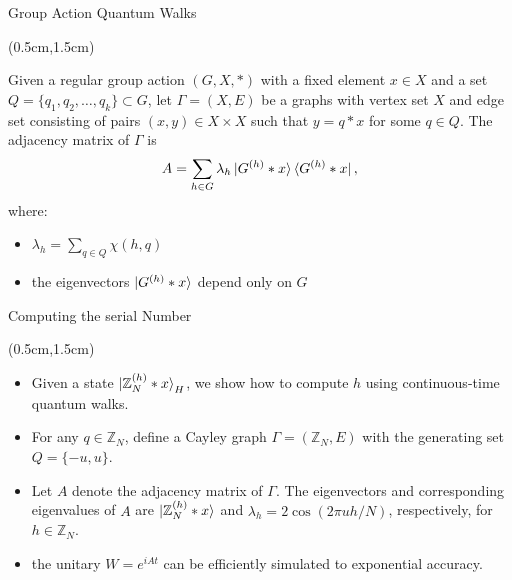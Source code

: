 \documentclass{beamer}
\theoremstyle{definition}
\begin{document}
\begin{frame}{Group Action Quantum Walks}
    
    \begin{textblock*}{12cm}(0.5cm,1.5cm)
               
        Given a regular group action $(G, X, *)$ with a fixed element $x \in X$ and a set  $Q = \{q_1, q_2, \dots, q_k\} \subset G$, let $\Gamma = (X, E)$ be a graphs with vertex set $X$ and edge set consisting of pairs $(x, y) \in X \times X$ such that $y = q * x$ for some $q \in Q$. The adjacency matrix of $\Gamma$ is
        \[ A = \sum_{h \in G} \lambda_h \ket{G^{(h)} * x} \bra{G^{(h)} * x}, \]
        where:
        \begin{itemize}
            \item $\lambda_h = \sum_{q \in Q} \chi(h, q)$
            \item the eigenvectors $\ket{G^{(h)} * x}$ depend only on $G$
        \end{itemize}

    \end{textblock*}

\end{frame}





\begin{frame}{Computing the serial Number}

    \begin{textblock*}{12cm}(0.5cm,1.5cm)

        \begin{itemize}
            \item Given a state $\ket{\mathbb{Z}_N^{(h)} * x}_H$, we show how to compute $h$ using continuous-time quantum walks.
            \vspace{0.5cm}
            \item For any $q \in \mathbb{Z}_N$, define a Cayley graph $\Gamma = (\mathbb{Z}_N, E)$ with the generating set $Q = \{-u, u\}$.
            \vspace{0.5cm}
            \item Let $A$ denote the adjacency matrix of $\Gamma$. The eigenvectors and corresponding eigenvalues of $A$ are $\ket{\mathbb{Z}_N^{(h)} * x}$ and $\lambda_h = 2\cos(2\pi uh / N)$, respectively, for $h \in \mathbb{Z}_N$.
            \vspace{0.5cm}
            \item the unitary $W = e^{iAt}$ can be efficiently simulated to exponential accuracy.
        \end{itemize}


    \end{textblock*}

 \end{frame}
\end{document}

